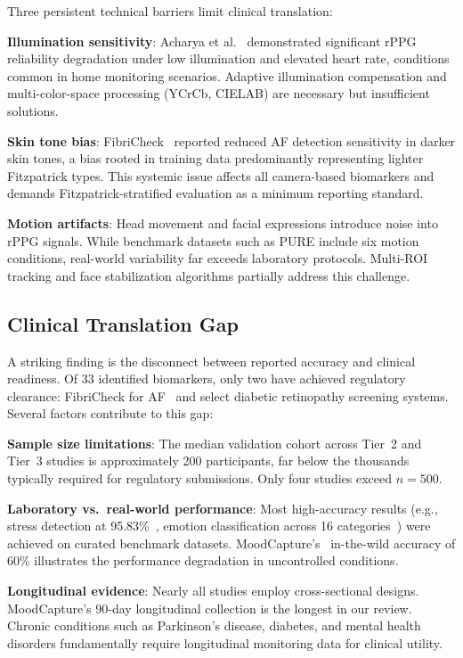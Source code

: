 \documentclass[conference]{IEEEtran}
\begin{document}
Three persistent technical barriers limit clinical translation:

\textbf{Illumination sensitivity}: Acharya et al.~\cite{acharya2025reliability} demonstrated significant rPPG reliability degradation under low illumination and elevated heart rate, conditions common in home monitoring scenarios. Adaptive illumination compensation and multi-color-space processing (YCrCb, CIELAB) are necessary but insufficient solutions.

\textbf{Skin tone bias}: FibriCheck~\cite{fibricheck2025} reported reduced AF detection sensitivity in darker skin tones, a bias rooted in training data predominantly representing lighter Fitzpatrick types. This systemic issue affects all camera-based biomarkers and demands Fitzpatrick-stratified evaluation as a minimum reporting standard.

\textbf{Motion artifacts}: Head movement and facial expressions introduce noise into rPPG signals. While benchmark datasets such as PURE include six motion conditions, real-world variability far exceeds laboratory protocols. Multi-ROI tracking and face stabilization algorithms partially address this challenge.

\subsection{Clinical Translation Gap}

A striking finding is the disconnect between reported accuracy and clinical readiness. Of 33 identified biomarkers, only two have achieved regulatory clearance: FibriCheck for AF~\cite{fibricheck2025} and select diabetic retinopathy screening systems. Several factors contribute to this gap:

\textbf{Sample size limitations}: The median validation cohort across Tier~2 and Tier~3 studies is approximately 200 participants, far below the thousands typically required for regulatory submissions. Only four studies exceed $n=500$.

\textbf{Laboratory vs.\ real-world performance}: Most high-accuracy results (e.g., stress detection at 95.83\%~\cite{fontes2024stress}, emotion classification across 16 categories~\cite{facialemotion2025}) were achieved on curated benchmark datasets. MoodCapture's~\cite{nepal2024moodcapture} in-the-wild accuracy of 60\% illustrates the performance degradation in uncontrolled conditions.

\textbf{Longitudinal evidence}: Nearly all studies employ cross-sectional designs. MoodCapture's 90-day longitudinal collection is the longest in our review. Chronic conditions such as Parkinson's disease, diabetes, and mental health disorders fundamentally require longitudinal monitoring data for clinical utility.
\end{document}
